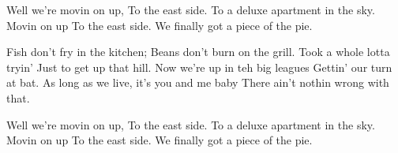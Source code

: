 Well we're movin on up, 
To the east side. 
To a deluxe apartment in the sky. 
Movin on up 
To the east side. 
We finally got a piece of the pie. 

Fish don't fry in the kitchen; 
Beans don't burn on the grill. 
Took a whole lotta tryin' 
Just to get up that hill. 
Now we're up in teh big leagues 
Gettin' our turn at bat. 
As long as we live, it's you and me baby 
There ain't nothin wrong with that. 

Well we're movin on up, 
To the east side. 
To a deluxe apartment in the sky. 
Movin on up 
To the east side. 
We finally got a piece of the pie. \cite{Kuklinski:1989a}

